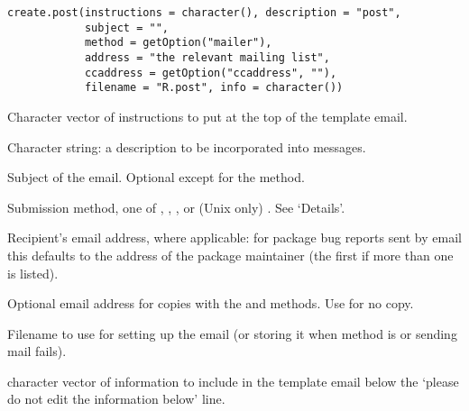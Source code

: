 %
\begin{Usage}
\begin{verbatim}
create.post(instructions = character(), description = "post",
            subject = "",
            method = getOption("mailer"),
            address = "the relevant mailing list",
            ccaddress = getOption("ccaddress", ""),
            filename = "R.post", info = character())
\end{verbatim}
\end{Usage}
%
\begin{Arguments}
\begin{ldescription}
\item[\code{instructions}] Character vector of instructions to put at the top
of the template email.
\item[\code{description}] Character string: a description to be incorporated
into messages.
\item[\code{subject}] Subject of the email. Optional except for the
 method.
\item[\code{method}] Submission method, one of , ,
,  or (Unix only) .
See `Details'.
\item[\code{address}] Recipient's email address, where applicable: for
package bug reports sent by email this defaults to the address of
the package maintainer (the first if more than one is listed).
\item[\code{ccaddress}] Optional email address for copies with the
 and  methods.
Use  for no copy.
\item[\code{filename}] Filename to use for setting up the email (or storing it when
method is  or sending mail fails).
\item[\code{info}] character vector of information to include in the template
email below the `please do not edit the information below' line.
\end{ldescription}
\end{Arguments}
%
